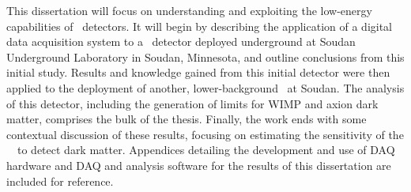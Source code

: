 
	This dissertation will focus on understanding and exploiting the low-energy
capabilities of \ppc~detectors.  %
It will begin by describing the application of a digital data acquisition
system to a \ppc~detector deployed underground at Soudan Underground Laboratory
in Soudan, Minnesota, and outline conclusions from this initial study.  Results
and knowledge gained from this initial detector were then applied to the
deployment of another, lower-background \ppc~at Soudan.  The analysis of this
detector, including the generation of limits for WIMP and axion dark matter,
comprises the bulk of the thesis.  Finally, the work ends with some contextual
discussion of these results, focusing on estimating the sensitivity of the
\MJ~\minmod~to detect dark matter.  Appendices detailing the development and
use of DAQ hardware and DAQ and analysis software for the results of this
dissertation are included for reference.
